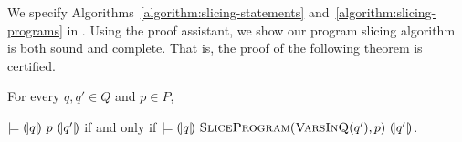 We specify Algorithms~\ref{algorithm:slicing-statements}
and~\ref{algorithm:slicing-programs} in \coq. Using the proof
assistant, we show our program slicing algorithm is both sound and
complete. That is, the proof of the following theorem is certified.

\begin{theorem}
  For every $q, q' \in Q$ and $p \in P$,
  \begin{center}
  $\models {(\!|}{q}{|\!)}~{p}~{(\!|}{q'}{|\!)}$ if and only if
  $\models {(\!|}{q}{|\!)}~{\textsc{SliceProgram}(\textsc{VarsInQ}(q'), p)}~{(\!|}{q'}{|\!)}$.
  \end{center}
  \label{theorem:program-slicing}
\end{theorem}